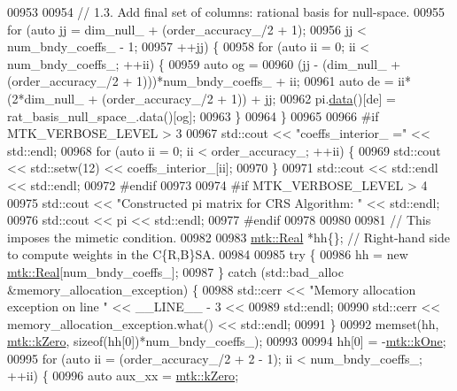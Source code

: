 \begin{DoxyCode}
{{00953 
00954   \textcolor{comment}{// 1.3. Add final set of columns: rational basis for null-space.}
00955   \textcolor{keywordflow}{for} (\textcolor{keyword}{auto} jj = dim\_null\_ + (order\_accuracy\_/2 + 1);
00956        jj < num\_bndy\_coeffs\_ - 1;
00957        ++jj) \{
00958     \textcolor{keywordflow}{for} (\textcolor{keyword}{auto} ii = 0; ii < num\_bndy\_coeffs\_; ++ii) \{
00959       \textcolor{keyword}{auto} og =
00960         (jj - (dim\_null\_ + (order\_accuracy\_/2 + 1)))*num\_bndy\_coeffs\_ + ii;
00961       \textcolor{keyword}{auto} de = ii*(2*dim\_null\_ + (order\_accuracy\_/2 + 1)) + jj;
00962       pi.\hyperlink{classmtk_1_1DenseMatrix_a0c33b8a9e01d157c61ddbdf807c25d84}{data}()[de] = rat\_basis\_null\_space\_.data()[og];
00963     \}
00964   \}
00965 
00966 \textcolor{preprocessor}{  #if MTK\_VERBOSE\_LEVEL > 3}
00967   std::cout << \textcolor{stringliteral}{"coeffs\_interior\_ ="} << std::endl;
00968   \textcolor{keywordflow}{for} (\textcolor{keyword}{auto} ii = 0; ii < order\_accuracy\_; ++ii) \{
00969     std::cout << std::setw(12) << coeffs\_interior\_[ii];
00970   \}
00971   std::cout << std::endl << std::endl;
00972 \textcolor{preprocessor}{  #endif}
00973 
00974 \textcolor{preprocessor}{  #if MTK\_VERBOSE\_LEVEL > 4}
00975   std::cout << \textcolor{stringliteral}{"Constructed pi matrix for CRS Algorithm: "} << std::endl;
00976   std::cout << pi << std::endl;
00977 \textcolor{preprocessor}{  #endif}
00978 
00980 
00981   \textcolor{comment}{// This imposes the mimetic condition.}
00982 
00983   \hyperlink{group__c01-roots_gac080bbbf5cbb5502c9f00405f894857d}{mtk::Real} *hh\{\};  \textcolor{comment}{// Right-hand side to compute weights in the C\{R,B\}SA.}
00984 
00985   \textcolor{keywordflow}{try} \{
00986     hh = \textcolor{keyword}{new} \hyperlink{group__c01-roots_gac080bbbf5cbb5502c9f00405f894857d}{mtk::Real}[num\_bndy\_coeffs\_];
00987   \} \textcolor{keywordflow}{catch} (std::bad\_alloc &memory\_allocation\_exception) \{
00988     std::cerr << \textcolor{stringliteral}{"Memory allocation exception on line "} << \_\_LINE\_\_ - 3 <<
00989       std::endl;
00990     std::cerr << memory\_allocation\_exception.what() << std::endl;
00991   \}
00992   memset(hh, \hyperlink{group__c01-roots_ga59a451a5fae30d59649bcda274fea271}{mtk::kZero}, \textcolor{keyword}{sizeof}(hh[0])*num\_bndy\_coeffs\_);
00993 
00994   hh[0] = -\hyperlink{group__c01-roots_ga26407c24d43b6b95480943340d285c71}{mtk::kOne};
00995   \textcolor{keywordflow}{for} (\textcolor{keyword}{auto} ii = (order\_accuracy\_/2 + 2 - 1); ii < num\_bndy\_coeffs\_; ++ii) \{
00996     \textcolor{keyword}{auto} aux\_xx = \hyperlink{group__c01-roots_ga59a451a5fae30d59649bcda274fea271}{mtk::kZero};
}}
\end{DoxyCode}
